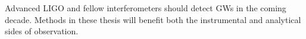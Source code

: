 \documentclass[leqno,twoside]{report}
\theoremstyle{plain}
\theoremstyle{definition}
\theoremstyle{remark}
\numberwithin{theorem}{chapter}        %
\begin{document}
Advanced LIGO and fellow interferometers should detect GWs in the coming decade.
Methods in these thesis will benefit both the instrumental and analytical sides of observation.

\end{document}
